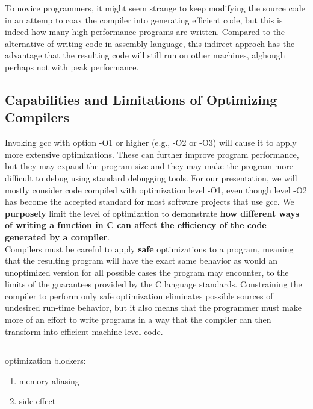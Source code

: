 \documentclass[11pt]{article}
\begin{document}
To novice programmers, it might seem strange to keep modifying the source code in an attemp to coax the compiler into generating efficient code, but this is indeed how many high-performance programs are written. Compared to the alternative of writing code in assembly language, this indirect approch has the advantage that the resulting code will still run on other machines, alghough perhaps not with peak performance.\\

\subsection{Capabilities and Limitations of Optimizing Compilers}
\label{sec:orgf8f6445}
Invoking gcc with option -O1 or higher (e.g., -O2 or -O3) will cause it to apply more extensive optimizations. These can further improve program performance, but they may expand the program size and they may make the program more difficult to debug using standard debugging tools. For our presentation, we will mostly consider code compiled with optimization level -O1, even though level -O2 has become the accepted standard for most software projects that use gcc. We \textbf{purposely} limit the level of optimization to demonstrate \textbf{how different ways of writing a function in C can affect the efficiency of the code generated by a compiler}.\\

Compilers must be careful to apply \textbf{safe} optimizations to a program, meaning that the resulting program will have the exact same behavior as would an unoptimized version for all possible cases the program may encounter, to the limits of the guarantees provided by the C language standards. Constraining the compiler to perform only safe optimization eliminates possible sources of undesired run-time behavior, but it also means that the programmer must make more of an effort to write programs in a way that the compiler can then transform into efficient machine-level code.\\

\noindent\rule{\textwidth}{0.5pt}
optimization blockers:\\
\begin{enumerate}
\item memory aliasing\\
\item side effect\\
\end{enumerate}
\end{document}
